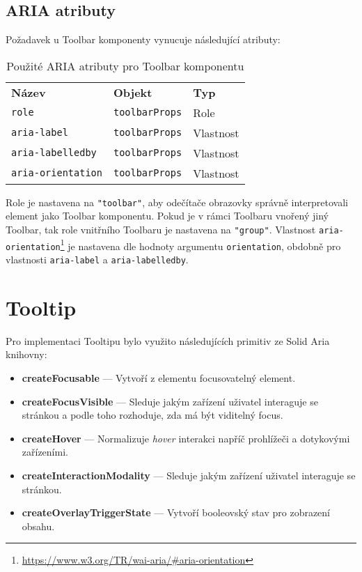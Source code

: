 \clearpage

\subsection{ARIA atributy}

Požadavek \hyperref[ofr12]{} u Toolbar komponenty vynucuje následující atributy:

\begin{table}[ht]\label{table:toolbar-aria}
    \begin{ctucolortab}
        \begin{tabularx}{\textwidth}{X X X}
            \bfseries Název           & \bfseries Objekt      & \bfseries Typ \\\Midrule{}
            \texttt{role}             & \texttt{toolbarProps} & Role          \\
            \texttt{aria-label}       & \texttt{toolbarProps} & Vlastnost     \\
            \texttt{aria-labelledby}  & \texttt{toolbarProps} & Vlastnost     \\
            \texttt{aria-orientation} & \texttt{toolbarProps} & Vlastnost
        \end{tabularx}
    \end{ctucolortab}
    \caption{Použité ARIA atributy pro Toolbar komponentu}
\end{table}

Role je nastavena na \texttt{"toolbar"}, aby odečítače obrazovky správně interpretovali element jako Toolbar komponentu.
Pokud je v rámci Toolbaru vnořený jiný Toolbar, tak role vnitřního Toolbaru je nastavena na \texttt{"group"}.
Vlastnost \texttt{aria-orientation}\footnote{\url{https://www.w3.org/TR/wai-aria/\#aria-orientation}} je nastavena dle hodnoty argumentu \texttt{orientation}, obdobně pro vlastnosti \texttt{aria-label} a \texttt{aria-labelledby}.

\section{Tooltip}

Pro implementaci Tooltipu bylo využito následujících primitiv ze Solid Aria knihovny:

\begin{itemize}
    \item \textbf{createFocusable} --- Vytvoří z elementu focusovatelný element.
    \item \textbf{createFocusVisible} --- Sleduje jakým zařízení uživatel interaguje se stránkou a podle toho rozhoduje, zda má být viditelný focus.
    \item \textbf{createHover} --- Normalizuje \textit{hover} interakci napříč prohlížeči a dotykovými zařízeními.
    \item \textbf{createInteractionModality} --- Sleduje jakým zařízení uživatel interaguje se stránkou.
    \item \textbf{createOverlayTriggerState} --- Vytvoří booleovský stav pro zobrazení obsahu.
\end{itemize}

